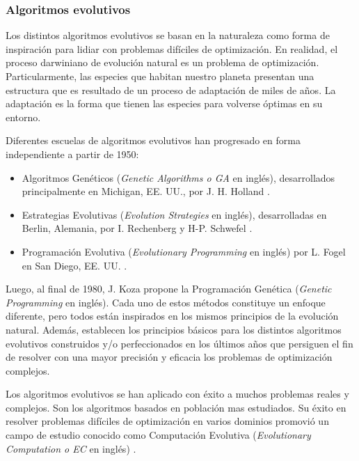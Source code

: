 \subsubsection{Algoritmos evolutivos}
Los distintos algoritmos evolutivos se basan en la naturaleza como forma de inspiración para lidiar con problemas difíciles de optimización. En realidad, el proceso darwiniano de evolución natural es un problema de optimización. Particularmente, las especies que habitan nuestro planeta presentan una estructura que es resultado de un proceso de adaptación de miles de años. La adaptación es la forma que tienen las especies para volverse óptimas en su entorno.


Diferentes escuelas de algoritmos evolutivos han progresado en forma independiente a partir de 1950: 
\begin{itemize}
    \item Algoritmos Genéticos (\textit{Genetic Algorithms o GA} en inglés), desarrollados principalmente en Michigan, EE. UU., por J. H. Holland \cite{Holland, Holland2}.
    
    \item Estrategias Evolutivas (\textit{Evolution Strategies} en inglés), desarrolladas en Berlin, Alemania, por I. Rechenberg \cite{Rechenberg, Rechenberg2} y H-P. Schwefel \cite{Schott, Schwefel}.
    
    \item Programación Evolutiva (\textit{Evolutionary Programming} en inglés) por L. Fogel en San Diego, EE. UU. \cite{Fogel, FogelOwens}.
\end{itemize}

Luego, al final de 1980, J. Koza \cite{Koza} propone la Programación Genética (\textit{Genetic Programming} en inglés). Cada uno de estos métodos constituye un enfoque diferente, pero todos están inspirados en los mismos principios de la evolución natural. Además, establecen los principios básicos para los distintos algoritmos evolutivos construidos y/o perfeccionados en los últimos años que persiguen el fin de resolver con una mayor precisión y eficacia los problemas de optimización complejos.


Los algoritmos evolutivos se han aplicado con éxito a muchos problemas reales y complejos. Son los algoritmos basados en población mas estudiados. Su éxito en resolver problemas difíciles de optimización en varios dominios promovió un campo de estudio conocido como Computación Evolutiva (\textit{Evolutionary Computation o EC} en inglés) \cite{BackFogelMichalewicz}.


